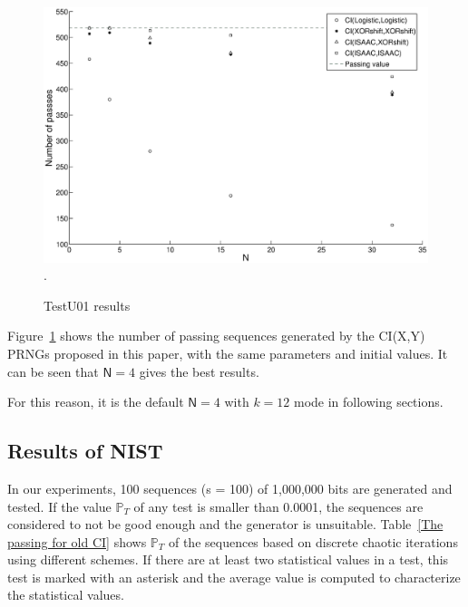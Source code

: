\begin{figure}
\centering
\includegraphics[scale=0.4]{images/N.eps} 
\DeclareGraphicsExtensions.
\caption{TestU01 results}
\label{TestU01 results}
\end{figure}

Figure~\ref{TestU01 results} shows the number of passing sequences generated by the CI(X,Y) PRNGs proposed in this paper, with the same parameters and initial values. %
It can be seen that $\mathsf{N}=4$ gives the best results.

For this reason, it is the default $\mathsf{N}=4$ with $k=12$ mode in following sections.

\subsection{Results of NIST}

In our experiments, 100 sequences (s = 100) of 1,000,000 bits are generated and tested. If the value $\mathbb{P}_T$ of any test is smaller than 0.0001, the sequences are considered to not be good enough and the generator is unsuitable. Table~\ref{The passing for old CI} shows $\mathbb{P}_T$ of the sequences based on discrete chaotic iterations using different schemes. If there are at least two statistical values in a test, this test is marked with an asterisk and the average value is computed to characterize the statistical values. 


